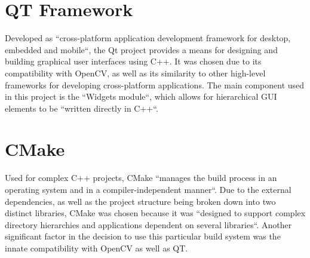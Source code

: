 \section{QT Framework}

Developed as ``cross-platform application development framework for desktop, embedded and mobile``, the
Qt project provides a means for designing and building graphical user interfaces using C++. It was chosen
due to its compatibility with OpenCV, as well as its similarity to other high-level frameworks for
developing cross-platform applications. The main component used in this project is the ``Widgets module``,
which allows for hierarchical GUI elements to be ``written directly in C++``.\cite{qtAbout}

\section{CMake}

Used for complex C++ projects, CMake ``manages the build process in an operating system and in a
compiler-independent manner``. Due to the external dependencies, as well as the project structure being
broken down into two distinct libraries, CMake was chosen because it was ``designed to support complex
directory hierarchies and applications dependent on several libraries``. Another significant factor in the
decision to use this particular build system was the innate compatibility with OpenCV as well as QT.
\cite{cmakeAbout}

